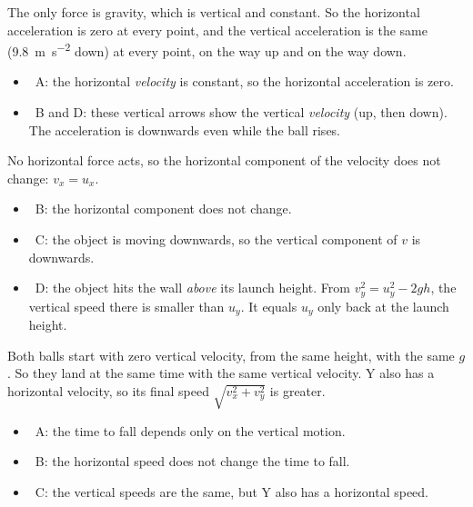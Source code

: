 \documentclass[12pt]{article}
\begin{document}
\begin{practiceanswers}
\begin{practiceans}
  The only force is gravity, which is vertical and constant. So the horizontal acceleration is zero
  at every point, and the vertical acceleration is the same (\qty{9.8}{m.s^{-2}} down) at every
  point, on the way up and on the way down.
  \begin{itemize}
    \item \xmark\ A: the horizontal \emph{velocity} is constant, so the horizontal acceleration is zero.
    \item \xmark\ B and D: these vertical arrows show the vertical \emph{velocity} (up, then down). The
          acceleration is downwards even while the ball rises.
  \end{itemize}
\end{practiceans}

\begin{practiceans}
  No horizontal force acts, so the horizontal component of the velocity does not change: $v_x = u_x$.
  \begin{itemize}
    \item \xmark\ B: the horizontal component does not change.
    \item \xmark\ C: the object is moving downwards, so the vertical component of $v$ is downwards.
    \item \xmark\ D: the object hits the wall \emph{above} its launch height. From $v_y^2 = u_y^2 - 2gh$,
          the vertical speed there is smaller than $u_y$. It equals $u_y$ only back at the launch
          height.
  \end{itemize}
\end{practiceans}

\begin{practiceans}
  Both balls start with zero vertical velocity, from the same height, with the same $g$. So they
  land at the same time with the same vertical velocity. Y also has a horizontal velocity, so its
  final speed $\sqrt{v_x^2 + v_y^2}$ is greater.
  \begin{itemize}
    \item \xmark\ A: the time to fall depends only on the vertical motion.
    \item \xmark\ B: the horizontal speed does not change the time to fall.
    \item \xmark\ C: the vertical speeds are the same, but Y also has a horizontal speed.
  \end{itemize}
\end{practiceans}


\end{practiceanswers}
\end{document}

